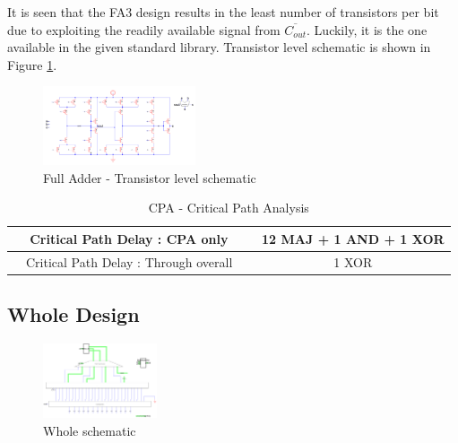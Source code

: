 \documentclass[journal]{IEEEtran}
\begin{document}
It is seen that the FA3 design results in the least number of transistors per bit due to exploiting the readily available signal from $\overline{C_{out}}$. Luckily, it is the one available in the given standard library. Transistor level schematic is shown in Figure \ref{fig:8}.

\vspace{-10pt}

\begin{figure}[h!]
  \centering
  \includegraphics[width=0.4\textwidth]{8.png}
  \centering
  \caption{Full Adder - Transistor level schematic}
  \label{fig:8}
\end{figure}

\vspace{-10pt}

\begin{table}[!h]
\renewcommand{\arraystretch}{1.5}
\caption{CPA - Critical Path Analysis}
\label{tab:t6}
\centering
\begin{tabular}{|c|c|}
\hline
~~Critical Path Delay : CPA only ~~ & 12 MAJ + 1 AND + 1 XOR\\\hline
~~Critical Path Delay : Through overall ~~ & 1 XOR\\\hline
\end{tabular}
\end{table}

\vspace{-10pt}


\subsection{Whole Design}

\begin{figure}[h!]
  \centering
  \includegraphics[width=0.3\textwidth]{9.png}
  \centering
  \caption{Whole schematic}
  \label{fig:9}
\end{figure}
\end{document}
